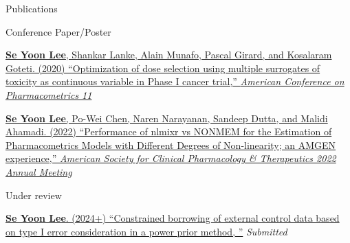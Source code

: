 \documentclass[
	11pt, %
]{resume} %
\begin{document}
\begin{rSection}{Publications}
\begin{rSubsection}{Conference Paper/Poster}{}{}{}
\item[] [1] 
\href{https://github.com/yain22/2PLD/blob/main/Poster/ACOP_Se_Yoon_Lee_PhD.pdf}{\underline{\textbf{Se Yoon Lee}}, Shankar Lanke, Alain Munafo, Pascal Girard, and Kosalaram Goteti. (2020)
``Optimization of dose selection using multiple surrogates of toxicity as continuous variable in Phase I cancer trial,'' \textit{American Conference on Pharmacometrics 11}}
\item[] [2] 
\href{https://github.com/yain22/2PLD/blob/main/Poster/ASCPT-2022-Poster_nlmixr_Final.pdf}{\underline{\textbf{Se Yoon Lee}}, Po-Wei Chen, Naren Narayanan, Sandeep Dutta, and Malidi Ahamadi. (2022)
``Performance of nlmixr vs NONMEM for the Estimation of Pharmacometrics Models with Different Degrees of Non-linearity; an AMGEN experience,'' \textit{American Society for Clinical Pharmacology \& Therapeutics 2022 Annual Meeting}}
\end{rSubsection}



\begin{rSubsection}{Under review}{}{}{}
\item[] [1]
\href{}{\underline{\textbf{Se Yoon Lee}}. (2024+)
	``Constrained borrowing of external control data based on type I error consideration in a power prior method, ''} \textit{Submitted}
\end{rSubsection}
\end{rSection}
\end{document}
